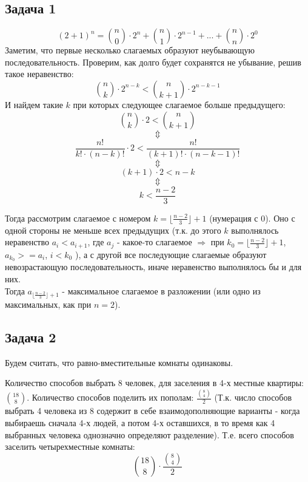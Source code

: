 \documentclass{article}
\begin{document}
\begin{center}
	\subsection*{Задача 1}
\end{center}
	$$ (2 + 1)^n = {n \choose 0} \cdot 2^n + {n \choose 1} \cdot 2^{n - 1} + ... + {n \choose n} \cdot 2^0 $$
	Заметим, что первые несколько слагаемых образуют неубывающую последовательность. Проверим, как долго будет сохранятся не убывание, решив такое неравенство:
	$$ {n \choose k} \cdot 2^{n - k} < {n \choose k + 1} \cdot 2^{n - k - 1}$$
	И найдем такие $k$ при которых следующее слагаемое больше предыдущего:
	$$ {n \choose k} \cdot 2 < {n \choose k + 1}$$
			$$ \Updownarrow $$
	$$ \frac{n!}{k! \cdot (n - k)!} \cdot 2 < \frac{n!}{(k + 1)! \cdot (n - k - 1)!}$$
			$$ \Updownarrow $$
		$$ (k + 1) \cdot 2 < n - k$$
			$$ \Updownarrow $$
		$$ k < \frac{n- 2}{3} $$
	
	Тогда рассмотрим слагаемое с номером $ k = \lfloor \frac{n - 2}{3} \rfloor + 1 $ (нумерация с 0).
	Оно с одной стороны не меньше всех предыдущих (т.к. до этого $k$ выполнялось неравенство $a_i < a_{i + 1}$, где $a_j$ - какое-то слагаемое  $ \Rightarrow$ при $ k_0 = \lfloor \frac{n - 2}{3} \rfloor + 1 $, $a_{k_0} >= a_i$, $i < k_0$ ), а с другой все последующие слагаемые образуют невозрастающую последовательность, иначе неравенство выполнялось бы и для них.
	\\
	Тогда $a_{\lfloor \frac{n - 2}{3} \rfloor + 1 }$ - максимальное слагаемое в разложении (или одно из максимальных, как при $n = 2$).

\begin{center}
	\subsection*{Задача 2}
\end{center}
Будем считать, что равно-вместительные комнаты одинаковы.

Количество способов выбрать 8 человек, для заселения в 4-х местные квартиры: ${18 \choose 8}$. Количество способов поделить их пополам:
$\frac{ {8 \choose 4}}{2} $ (Т.к. число способов выбрать 4 человека из 8 содержит в себе взаимодополняющие варианты - когда выбираешь сначала 4-х людей, а потом 4-х оставшихся, в то время как 4 выбранных человека однозначно определяют разделение). Т.е. всего способов заселить четырехместные комнаты:
$${18 \choose 8} \cdot \frac{ {8 \choose 4}}{2} $$
\end{document}

